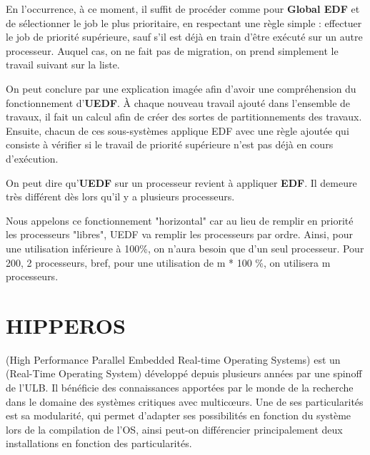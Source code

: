 		En l'occurrence, à ce moment, il suffit de procéder comme pour \textbf{Global EDF} et de sélectionner le job le plus prioritaire, en respectant 
		une règle simple : effectuer le job de priorité supérieure, sauf s'il 
		est déjà en train d'être exécuté sur un autre processeur. Auquel cas, on ne 
		fait pas de migration, on prend simplement le travail suivant sur la liste.\newline
		
		On peut conclure par une explication imagée afin d'avoir une compréhension du fonctionnement d'\textbf{UEDF}. À chaque nouveau travail ajouté dans l'ensemble de travaux, 
		il fait un calcul afin de créer des sortes de partitionnements des travaux. 
		Ensuite, chacun de ces sous-systèmes applique EDF avec une règle ajoutée qui consiste 
		à vérifier si le travail de priorité supérieure n'est pas déjà en cours d'exécution.
		
		On peut dire qu'\textbf{UEDF} sur un processeur revient à appliquer \textbf{EDF}. Il 
		demeure très différent dès lors qu'il y a plusieurs processeurs.
		
		
		
		Nous appelons ce fonctionnement "horizontal" car au lieu de remplir 
		en priorité les processeurs "libres", UEDF va remplir les 
		processeurs par ordre. Ainsi, pour une utilisation inférieure à 100\%, 
		on n'aura besoin que d'un seul processeur. Pour 200, 2 processeurs, bref, 
		pour une utilisation de m * 100 \%, on utilisera m processeurs.
		
		
\section{HIPPEROS}
	 (High Performance Parallel Embedded Real-time Operating Systems)
	est un  (Real-Time Operating System) développé depuis plusieurs années par une spinoff de l'ULB.
	Il bénéficie des connaissances apportées par le monde de la recherche dans 
	le domaine des systèmes critiques avec multic\oe{}urs. Une de ses particularités 
	est sa modularité, qui permet d'adapter ses possibilités en fonction du système 
	lors de la compilation de l'OS, ainsi peut-on différencier principalement 
	deux installations en fonction des particularités. 
	

